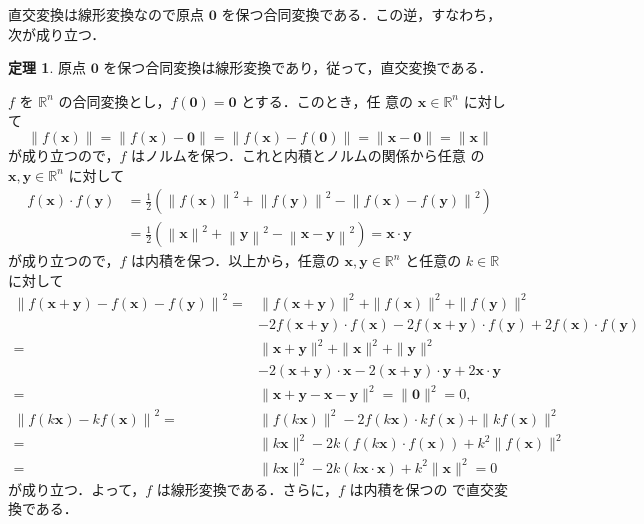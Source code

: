 \documentclass[11pt, uplatex, dvipdfmx, titlepage]{jsarticle}
\makeatletter
\renewenvironment{proof}[1][\proofname]{\par
  \pushQED{\qed}%
  \normalfont \topsep6\p@\@plus6\p@\relax
  \trivlist
  \item[\hskip\labelsep
         \bfseries
    {#1}]\ignorespaces
}{%
  \popQED\endtrivlist\@endpefalse
}
\theoremstyle{definition}
\newtheorem{theorem}{定理}[section]
\renewcommand{\proofname}{\textbf{証明}}
\makeatother
\begin{document}
直交変換は線形変換なので原点 $\bm{0}$ を保つ合同変換である．この逆，すなわち，次が成り立つ．

\begin{theorem}\label{thm:prev0}
  原点 $\bm{0}$ を保つ合同変換は線形変換であり，従って，直交変換である．
\end{theorem}

\begin{proof}
  $f$ を $\mathbb{R}^n$ の合同変換とし，$f(\bm{0}) = \bm{0}$ とする．このとき，任
  意の $\bm{x} \in \mathbb{R}^n$ に対して
  \[
    \|f(\bm{x})\| = \|f(\bm{x})-\bm{0}\| =\|f(\bm{x})-f(\bm{0})\|  = \|\bm{x}-\bm{0}\| = \| \bm{x}\|
  \]
  が成り立つので，$f$ はノルムを保つ．これと内積とノルムの関係から任意
  の $\bm{x}, \bm{y} \in \mathbb{R}^n$ に対して
  \begin{align*}
    f(\bm{x})\cdot  f(\bm{y})
    &= \frac{1}{2}\left( \left\|f(\bm{x})\right\|^2+\left\|f(\bm{y})\right\|^2- \left\|f(\bm{x})-f(\bm{y})\right\|^2\right)\\
    & =\frac{1}{2}\left(\left\|\bm{x}\right\|^2+\left\|\bm{y}\right\|^2 - \left\|\bm{x}-\bm{y}\right\|^2\right)
      = \bm{x} \cdot  \bm{y}
  \end{align*}
  が成り立つので，$f$ は内積を保つ．以上から，任意の $\bm{x}, \bm{y}
  \in \mathbb{R}^n$ と任意の $k \in \mathbb{R}$ に対して
  \begin{align*}
    \left\|f(\bm{x}+\bm{y}) -  f(\bm{x}) - f(\bm{y}) \right\|^2
    =& \|f(\bm{x}+\bm{y})\|^2+\|f(\bm{x})\|^2+\|f(\bm{y})\|^2\\
     &- 2f(\bm{x}+\bm{y})\cdot  f(\bm{x})
       -2f(\bm{x}+\bm{y})\cdot  f(\bm{y}) +2f(\bm{x})\cdot f(\bm{y})\\
    =& \| \bm{x} + \bm{y}\|^2 + \|\bm{x}\|^2+\|\bm{y}\|^2\\
     &-2(\bm{x}+\bm{y})\cdot \bm{x} -2(\bm{x}+\bm{y})\cdot  \bm{y}+2\bm{x}\cdot \bm{y}\\
    =& \|\bm{x}+\bm{y} - \bm{x}-\bm{y}\|^2=\|\bm{0}\|^2=0,\\
    \left\| f(k\bm{x}) - k f(\bm{x})\right\|^2  
    =& \|f(k\bm{x})\|^2-2 f(k\bm{x})\cdot kf(\bm{x}) + \|kf(\bm{x})\|^2\\
    =& \|k\bm{x}\|^2 - 2k \left(f(k\bm{x})\cdot f(\bm{x}) \right)+ k^2\|f(\bm{x})\|^2\\
    =& \|k\bm{x}\|^2-2k\left( k\bm{x}\cdot  \bm{x}\right) + k^2 \|\bm{x}\|^2=0
  \end{align*}
  が成り立つ．よって，$f$ は線形変換である．さらに，$f$ は内積を保つの
  で直交変換である．
\end{proof}
\end{document}

